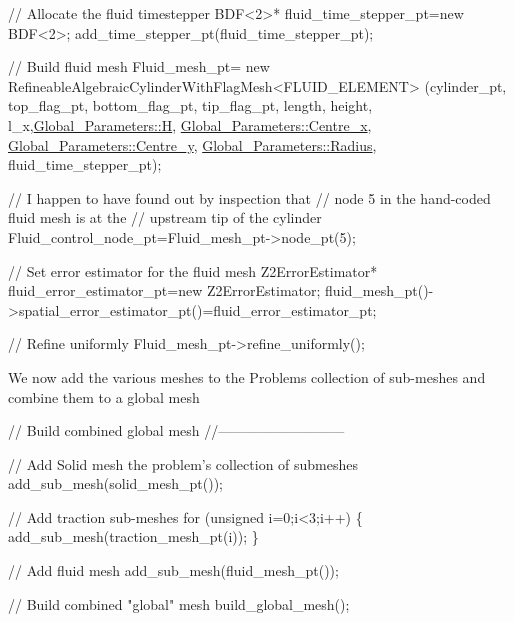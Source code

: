 \begin{DoxyCodeInclude}

 \textcolor{comment}{// Allocate the fluid timestepper}
 BDF<2>* fluid\_time\_stepper\_pt=\textcolor{keyword}{new} BDF<2>;
 add\_time\_stepper\_pt(fluid\_time\_stepper\_pt);
 
 \textcolor{comment}{// Build fluid mesh}
 Fluid\_mesh\_pt=
  \textcolor{keyword}{new} RefineableAlgebraicCylinderWithFlagMesh<FLUID\_ELEMENT>
  (cylinder\_pt, 
   top\_flag\_pt,
   bottom\_flag\_pt,
   tip\_flag\_pt,
   length, height, 
   l\_x,\hyperlink{namespaceGlobal__Parameters_ab360628e7830e43e355ce5768f6d6a6c}{Global\_Parameters::H},
   \hyperlink{namespaceGlobal__Parameters_a0f0247cc83ba202413b50e7b4b7fceb0}{Global\_Parameters::Centre\_x},
   \hyperlink{namespaceGlobal__Parameters_af41282d812fdff4867e3d8c825886290}{Global\_Parameters::Centre\_y},
   \hyperlink{namespaceGlobal__Parameters_a126c1e491ef187867b6b7bfb52b476ad}{Global\_Parameters::Radius},
   fluid\_time\_stepper\_pt);
 

 \textcolor{comment}{// I happen to have found out by inspection that}
 \textcolor{comment}{// node 5 in the hand-coded fluid mesh is at the }
 \textcolor{comment}{// upstream tip of the cylinder}
 Fluid\_control\_node\_pt=Fluid\_mesh\_pt->node\_pt(5);

 \textcolor{comment}{// Set error estimator for the fluid mesh}
 Z2ErrorEstimator* fluid\_error\_estimator\_pt=\textcolor{keyword}{new} Z2ErrorEstimator;
 fluid\_mesh\_pt()->spatial\_error\_estimator\_pt()=fluid\_error\_estimator\_pt;

 \textcolor{comment}{// Refine uniformly}
 Fluid\_mesh\_pt->refine\_uniformly();

\end{DoxyCodeInclude}


We now add the various meshes to the {\ttfamily Problem\textquotesingle{}s} collection of sub-\/meshes and combine them to a global mesh


\begin{DoxyCodeInclude}


 \textcolor{comment}{// Build combined global mesh}
 \textcolor{comment}{//---------------------------}

 \textcolor{comment}{// Add Solid mesh the problem's collection of submeshes}
 add\_sub\_mesh(solid\_mesh\_pt());

 \textcolor{comment}{// Add traction sub-meshes}
 \textcolor{keywordflow}{for} (\textcolor{keywordtype}{unsigned} i=0;i<3;i++)
  \{
   add\_sub\_mesh(traction\_mesh\_pt(i));
  \}

 \textcolor{comment}{// Add fluid mesh}
 add\_sub\_mesh(fluid\_mesh\_pt());
 
 \textcolor{comment}{// Build combined "global" mesh}
 build\_global\_mesh();

\end{DoxyCodeInclude}



